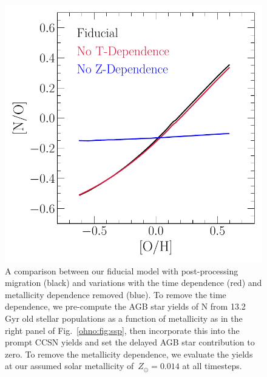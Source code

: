 \begin{figure}
\centering
\includegraphics[scale = 0.6]{t_z_dep_comp.pdf}
\caption{
A comparison between our fiducial model with post-processing migration (black)
and variations with the time dependence (red) and metallicity dependence 
removed (blue).
To remove the time dependence, we pre-compute the AGB star yields of N from
13.2 Gyr old stellar populations as a function of metallicity as in the right
panel of Fig.~\ref{ohno:fig:ssp}, then incorporate this into the prompt CCSN yields
and set the delayed AGB star contribution to zero.
To remove the metallicity dependence, we evaluate the yields at our assumed
solar metallicity of~$Z_\odot = 0.014$ at all timesteps.
}
\label{ohno:fig:t_z_dep_comp}
\end{figure}

